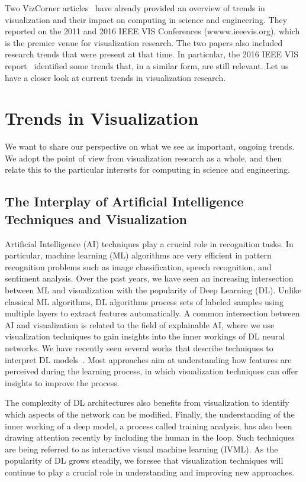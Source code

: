 \documentclass[10pt,journal,compsoc]{IEEEtran}
\begin{document}
Two VizCorner articles~\cite{Scheidegger2011,Comba2017} have already provided an overview of trends in visualization and their impact on computing in science and engineering. They reported on the 2011 and 2016 IEEE VIS Conferences (wwww.ieeevis.org), which is the premier venue for visualization research. The two papers also included research trends that were present at that time. In particular, the 2016 IEEE VIS report~\cite{Comba2017} identified some trends that, in a similar form, are still relevant. Let us have a closer look at current trends in visualization research.


\section{Trends in Visualization}

We want to share our perspective on what we see as important, ongoing trends. We adopt the point of view from visualization research as a whole, and then relate this to the particular interests for computing in science and engineering.

\subsection{The Interplay of Artificial Intelligence Techniques and Visualization}

Artificial Intelligence (AI) techniques play a crucial role in recognition tasks. In particular, machine learning (ML) algorithms are very efficient in pattern recognition problems such as image classification, speech recognition, and sentiment analysis. Over the past years, we have seen an increasing intersection between ML and visualization with the popularity of Deep Learning (DL). Unlike classical ML algorithms, DL algorithms process sets of labeled samples using multiple layers to extract features automatically.
A common intersection between AI and visualization is related to the field of explainable AI, where we use visualization techniques to gain insights into the inner workings of DL neural networks. We have recently seen several works that describe techniques to interpret DL models~\cite{hohman2018visual,GARCIA2018}. Most approaches aim at understanding how features are perceived during the learning process, in which visualization techniques can offer insights to improve the process.

The complexity of DL architectures also benefits from visualization to identify which aspects of the network can be modified. Finally, the understanding of the inner working of a deep model, a process called training analysis, has also been drawing attention recently by including the human in the loop. Such techniques are being referred to as interactive visual machine learning (IVML). As the popularity of DL grows steadily, we foresee that visualization techniques will continue to play a crucial role in understanding and improving new approaches. 
\end{document}
